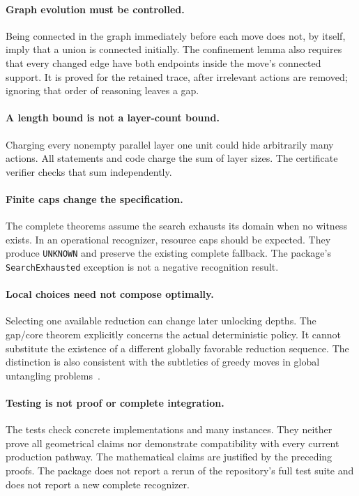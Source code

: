 \documentclass[11pt]{article}
\theoremstyle{definition}
\newcommand{\code}[1]{\texttt{#1}}
\begin{document}
\paragraph{Graph evolution must be controlled.}
Being connected in the graph immediately before each move does not, by
itself, imply that a union is connected initially. The confinement lemma
also requires that every changed edge have both endpoints inside the
move's connected support. It is proved for the retained trace, after
irrelevant actions are removed; ignoring that order of reasoning leaves
a gap.

\paragraph{A length bound is not a layer-count bound.}
Charging every nonempty parallel layer one unit could hide arbitrarily
many actions. All statements and code charge the sum of layer sizes.
The certificate verifier checks that sum independently.

\paragraph{Finite caps change the specification.}
The complete theorems assume the search exhausts its domain when no
witness exists. In an operational recognizer, resource caps should be
expected. They produce \code{UNKNOWN} and preserve the existing complete
fallback. The package's \code{SearchExhausted} exception is not a negative
recognition result.

\paragraph{Local choices need not compose optimally.}
Selecting one available reduction can change later unlocking depths.
The gap/core theorem explicitly concerns the actual deterministic policy.
It cannot substitute the existence of a different globally favorable
reduction sequence. The distinction is also consistent with the subtleties
of greedy moves in global untangling problems~\cite{lrt}.

\paragraph{Testing is not proof or complete integration.}
The tests check concrete implementations and many instances. They neither
prove all geometrical claims nor demonstrate compatibility with every
current production pathway. The mathematical claims are justified by the
preceding proofs. The package does not report a rerun of the repository's
full test suite and does not report a new complete recognizer.
\end{document}
